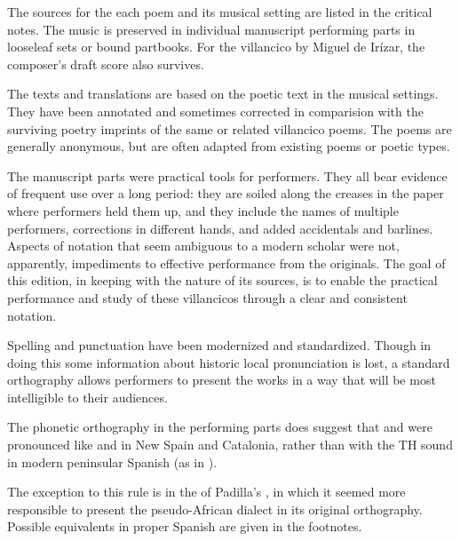
The sources for the each poem and its musical setting are listed in the 
critical notes.
The music is preserved in individual manuscript performing parts in looseleaf 
sets or bound partbooks.
For the villancico by Miguel de Irízar, the composer's draft score also 
survives.

The texts and translations are based on the poetic text in the musical settings.
They have been annotated and sometimes corrected in comparision with the 
surviving poetry imprints of the same or related villancico poems.
The poems are generally anonymous, but are often adapted from existing poems or 
poetic types.

The manuscript parts were practical tools for performers.
They all bear evidence of frequent use over a long period: they are soiled 
along the creases in the paper where performers held them up, and they include 
the names of multiple performers, corrections in different hands, and added 
accidentals and barlines.
Aspects of notation that seem ambiguous to a modern scholar were not, 
apparently, impediments to effective performance from the originals.
The goal of this edition, in keeping with the nature of its sources, is to 
enable the practical performance and study of these villancicos through a clear
and consistent notation.


Spelling and punctuation have been modernized and standardized.
Though in doing this some information about historic local pronunciation is
lost, a standard orthography allows performers to present the works in a way
that will be most intelligible to their audiences.%
\begin{Footnote}
    The phonetic orthography in the performing parts does suggest that
     and  were pronounced like  and
     in New Spain and Catalonia, rather than with the TH sound in
    modern peninsular Spanish (as in ).
\end{Footnote}
The exception to this rule is in the  of Padilla's , in which it seemed more responsible to present the 
pseudo-African dialect in its original orthography.
Possible equivalents in proper Spanish are given in the footnotes.

